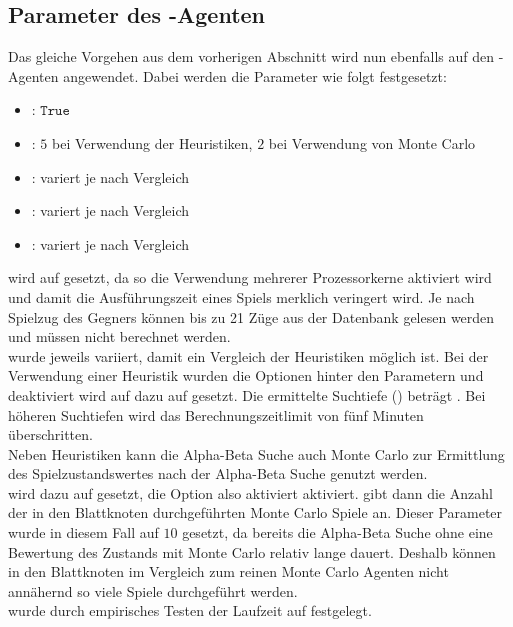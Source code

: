 \subsection{Parameter des -Agenten}
\label{eval:agents:params:subsec-ab}
Das gleiche Vorgehen aus dem vorherigen Abschnitt wird nun ebenfalls auf den -Agenten angewendet.
Dabei werden die Parameter wie folgt festgesetzt:
\begin{itemize}
\item {}: $\mathtt{True}$
\item {}: $5$ bei Verwendung der Heuristiken, $2$ bei Verwendung von Monte Carlo
\item {}: variert je nach Vergleich
\item {}: variert je nach Vergleich
\item {}: variert je nach Vergleich
\end{itemize}
 wird auf  gesetzt, da so die Verwendung mehrerer Prozessorkerne aktiviert wird und damit die Ausführungszeit eines Spiels merklich veringert wird. Je nach Spielzug des Gegners können bis zu 21 Züge aus der Datenbank  gelesen werden und müssen nicht berechnet werden.
\\ wurde jeweils variiert, damit ein Vergleich der Heuristiken möglich ist. Bei der Verwendung einer Heuristik wurden die Optionen hinter den Parametern  und  deaktiviert  wird auf dazu auf  gesetzt. 
Die ermittelte Suchtiefe () beträgt . Bei höheren Suchtiefen wird das Berechnungszeitlimit von fünf Minuten überschritten.
\vspace{0.5cm}
\\Neben Heuristiken kann die Alpha-Beta Suche auch Monte Carlo zur Ermittlung des Spielzustandswertes nach der Alpha-Beta Suche genutzt werden.
\\ wird dazu auf  gesetzt, die Option also aktiviert aktiviert.  gibt dann die Anzahl der in den Blattknoten durchgeführten Monte Carlo Spiele an. Dieser Parameter wurde in diesem Fall auf $10$ gesetzt, da bereits die Alpha-Beta Suche ohne eine Bewertung des Zustands mit Monte Carlo relativ lange dauert. Deshalb können in den Blattknoten im Vergleich zum reinen Monte Carlo Agenten nicht annähernd so viele Spiele durchgeführt werden.
\\ wurde durch empirisches Testen der Laufzeit auf  festgelegt. 

